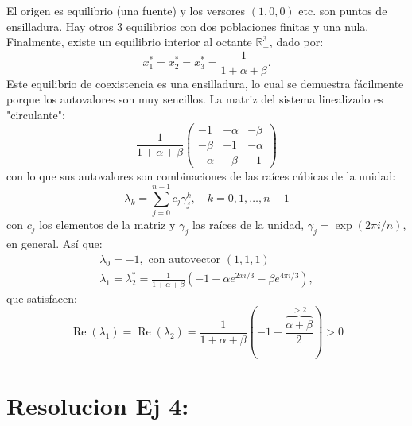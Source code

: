 \documentclass[twocolumn,aps,prl]{revtex4-1}
\begin{document}
El origen es equilibrio (una fuente) y los versores $(1,0,0)$ etc. son puntos de ensilladura. Hay otros 3 equilibrios con dos poblaciones finitas y una nula. Finalmente, existe un equilibrio interior al octante $\mathbb{R}_{+}^{3}$, dado por:
$$
x_{1}^{*}=x_{2}^{*}=x_{3}^{*}=\frac{1}{1+\alpha+\beta} .
$$
Este equilibrio de coexistencia es una ensilladura, lo cual se demuestra fácilmente porque los autovalores son muy sencillos. La matriz del sistema linealizado es "circulante":
$$
\frac{1}{1+\alpha+\beta}\left(\begin{array}{ccc}
-1 & -\alpha & -\beta \\
-\beta & -1 & -\alpha \\
-\alpha & -\beta & -1
\end{array}\right)
$$
con lo que sus autovalores son combinaciones de las raíces cúbicas de la unidad:
$$
\lambda_{k}=\sum_{j=0}^{n-1} c_{j} \gamma_{j}^{k}, \quad k=0,1, \ldots, n-1
$$
con $c_{j}$ los elementos de la matriz y $\gamma_{j}$ las raíces de la unidad, $\gamma_{j}=\exp (2 \pi i / n)$, en general. Así que:
$$
\begin{array}{c}
\lambda_{0}=-1, \text { con autovector }(1,1,1) \\
\lambda_{1}=\lambda_{2}^{*}=\frac{1}{1+\alpha+\beta}\left(-1-\alpha e^{2 x i / 3}-\beta e^{4 \pi i / 3}\right),
\end{array}
$$
que satisfacen:
$$
\operatorname{Re}\left(\lambda_{1}\right)=\operatorname{Re}\left(\lambda_{2}\right)=\frac{1}{1+\alpha+\beta}\left(-1+\frac{\overbrace{\alpha+\beta}^{>2}}{2}\right)>0
$$

% 
%                             
% 

\section{Resolucion Ej 4:}

\end{document}
